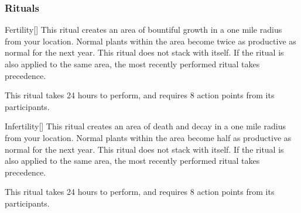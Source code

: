 \subsubsection{Rituals}


\lowercase{\hypertarget{spell:Fertility}{}}\label{spell:Fertility}
\begin{apability}[Rank 3]{\hypertarget{spell:Fertility}{Fertility}}[]
\targetrule
This ritual creates an area of bountiful growth in a one mile radius  from your location.
Normal plants within the area become twice as productive as normal for the next year.
This ritual does not stack with itself.
If the  ritual is also applied to the same area, the most recently performed ritual takes precedence.

This ritual takes 24 hours to perform, and requires 8 action points from its participants.
\end{apability}
\vspace{0.25em}



\lowercase{\hypertarget{spell:Infertility}{}}\label{spell:Infertility}
\begin{apability}[Rank 3]{\hypertarget{spell:Infertility}{Infertility}}[]
\targetrule
This ritual creates an area of death and decay in a one mile radius  from your location.
Normal plants within the area become half as productive as normal for the next year.
This ritual does not stack with itself.
If the  ritual is also applied to the same area, the most recently performed ritual takes precedence.

This ritual takes 24 hours to perform, and requires 8 action points from its participants.
\end{apability}
\vspace{0.25em}



